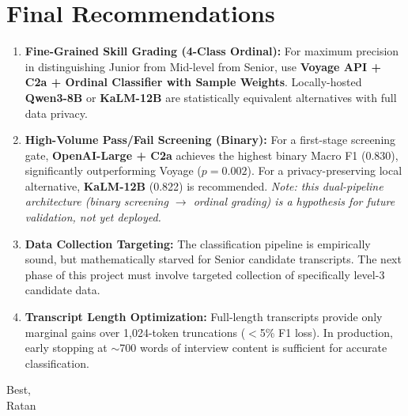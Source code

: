 \documentclass[11pt]{article}
\begin{document}
\section{Final Recommendations}

\begin{enumerate}
    \item \textbf{Fine-Grained Skill Grading (4-Class Ordinal):} For maximum precision in distinguishing Junior from Mid-level from Senior, use \textbf{Voyage API + C2a + Ordinal Classifier with Sample Weights}. Locally-hosted \textbf{Qwen3-8B} or \textbf{KaLM-12B} are statistically equivalent alternatives with full data privacy.
    \item \textbf{High-Volume Pass/Fail Screening (Binary):} For a first-stage screening gate, \textbf{OpenAI-Large + C2a} achieves the highest binary Macro F1 (0.830), significantly outperforming Voyage ($p = 0.002$). For a privacy-preserving local alternative, \textbf{KaLM-12B} (0.822) is recommended. \emph{Note: this dual-pipeline architecture (binary screening $\rightarrow$ ordinal grading) is a hypothesis for future validation, not yet deployed.}
    \item \textbf{Data Collection Targeting:} The classification pipeline is empirically sound, but mathematically starved for Senior candidate transcripts. The next phase of this project must involve targeted collection of specifically level-3 candidate data.
    \item \textbf{Transcript Length Optimization:} Full-length transcripts provide only marginal gains over 1,024-token truncations ($<$5\% F1 loss). In production, early stopping at $\sim$700 words of interview content is sufficient for accurate classification.
\end{enumerate}

Best, \\
Ratan
\end{document}
